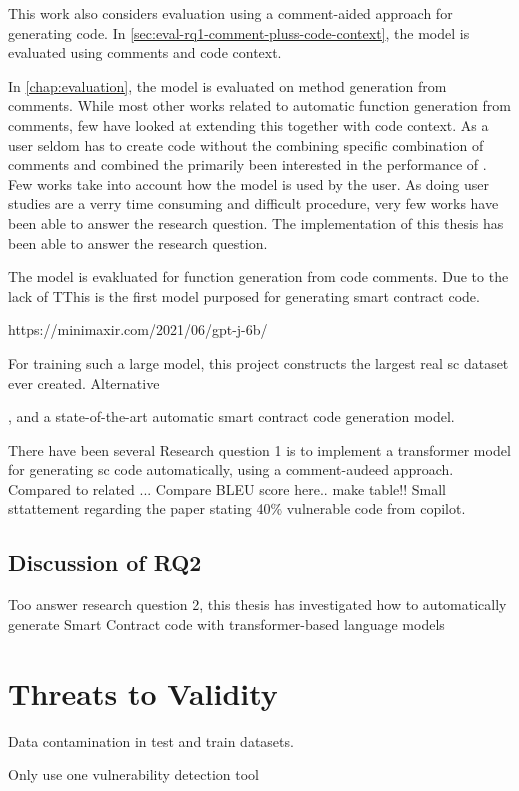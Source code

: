 This work also considers evaluation using a comment-aided approach for generating code. In \cref{sec:eval-rq1-comment-pluss-code-context}, the model is evaluated using comments and code context. 

In \cref{chap:evaluation}, the model is evaluated on method generation from comments. While most other works related to automatic function generation from comments, few have looked at extending this together with code context. As a user seldom has to create code without  the combining specific combination of comments and combined the primarily been interested in the performance of . Few works take into account how the model is used by the user. As doing user studies are a verry time consuming and difficult procedure, very few works have been able to answer the research question. The implementation of this thesis has been able to answer the research question.



The  model is evakluated for function generation from code comments. Due to the lack of 
TThis is the first model purposed for generating smart contract code. 

https://minimaxir.com/2021/06/gpt-j-6b/



For training such a large model, this project constructs the largest real \acrshort{sc} dataset ever created. Alternative 

, and a state-of-the-art automatic smart contract code generation model.

There have been several 
Research question 1 is to implement a transformer model for generating \acrshort{sc} code automatically, using a comment-audeed approach.
Compared to related ...  Compare BLEU score here.. make table!! 
Small sttattement regarding the paper stating 40\% vulnerable code from copilot.


\subsection{Discussion of RQ2}
Too answer research question 2, this thesis has investigated how to automatically generate Smart Contract code with transformer-based language models

\section{Threats to Validity}

Data contamination in test and train datasets.

Only use one vulnerability detection tool